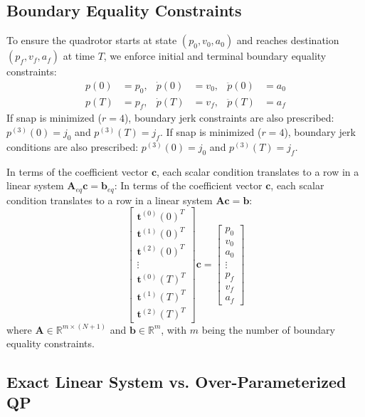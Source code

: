 \documentclass[11pt,a4paper]{article}
\begin{document}
\subsection{Boundary Equality Constraints}

To ensure the quadrotor starts at state $(p_0, v_0, a_0)$ and reaches destination $(p_f, v_f, a_f)$ at time $T$, we enforce initial and terminal boundary equality constraints:
\begin{align}
p(0) &= p_0, & \dot{p}(0) &= v_0, & \ddot{p}(0) &= a_0 \\
p(T) &= p_f, & \dot{p}(T) &= v_f, & \ddot{p}(T) &= a_f
\end{align}
If snap is minimized ($r=4$), boundary jerk constraints are also prescribed: $p^{(3)}(0) = j_0$ and $p^{(3)}(T) = j_f$.
If snap is minimized ($r=4$), boundary jerk conditions are also prescribed: $p^{(3)}(0) = j_0$ and $p^{(3)}(T) = j_f$.

In terms of the coefficient vector $\mathbf{c}$, each scalar condition translates to a row in a linear system $\mathbf{A}_{eq} \mathbf{c} = \mathbf{b}_{eq}$:
In terms of the coefficient vector $\mathbf{c}$, each scalar condition translates to a row in a linear system $\mathbf{A} \mathbf{c} = \mathbf{b}$:
\begin{equation}
\label{eq:boundary_system}
\begin{bmatrix}
\mathbf{t}^{(0)}(0)^T \\
\mathbf{t}^{(1)}(0)^T \\
\mathbf{t}^{(2)}(0)^T \\
\vdots \\
\mathbf{t}^{(0)}(T)^T \\
\mathbf{t}^{(1)}(T)^T \\
\mathbf{t}^{(2)}(T)^T
\end{bmatrix} \mathbf{c}
=
\begin{bmatrix}
p_0 \\ v_0 \\ a_0 \\ \vdots \\ p_f \\ v_f \\ a_f
\end{bmatrix}
\end{equation}
where $\mathbf{A} \in \mathbb{R}^{m \times (N+1)}$ and $\mathbf{b} \in \mathbb{R}^m$, with $m$ being the number of boundary equality constraints.

\subsection{Exact Linear System vs. Over-Parameterized QP}
\end{document}
